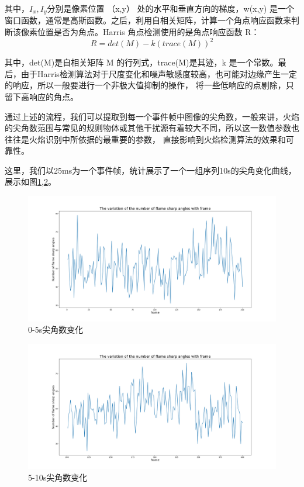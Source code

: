 其中，$I_x,I_y$分别是像素位置 （x,y） 处的水平和垂直方向的梯度，w(x,y) 是一个窗口函数，通常是高斯函数。之后，利用自相关矩阵，计算一个角点响应函数来判断该像素位置是否为角点。Harris 角点检测使用的是角点响应函数 
R：
\begin{equation} 
    R=det(M)-k(trace(M))^2
\end{equation}

其中，det(M)是自相关矩阵 M 的行列式，trace(M)是其迹，k 是一个常数。最后，由于Harris检测算法对于尺度变化和噪声敏感度较高，也可能对边缘产生一定的响应，所以一般要进行一个非极大值抑制的操作，
将一些低响应的点剔除，只留下高响应的角点。

通过上述的流程，我们可以提取到每一个事件帧中图像的尖角数，一般来讲，火焰的尖角数范围与常见的规则物体或其他干扰源有着较大不同，所以这一数值参数也往往是火焰识别中所依据的最重要的参数，
直接影响到火焰检测算法的效果和可靠性。

这里，我们以25ms为一个事件帧，统计展示了一个一组序列10s的尖角变化曲线，展示如图\ref{6},\ref{7}。
\begin{figure}[ht]
    \centering
    \includegraphics[width=\textwidth]{figures/extract_tip_01.png}
    \caption{0-5s尖角数变化}
    \label{6}
    \end{figure}

\begin{figure}[ht]
    \centering
    \includegraphics[width=\textwidth]{figures/extract_tip_02.png}
    \caption{5-10s尖角数变化}
    \label{7}
    \end{figure}

